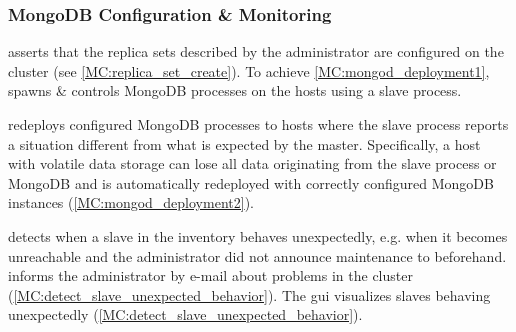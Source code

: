 \subsubsection{MongoDB Configuration \& Monitoring}
\begin{description}
	 \mamid asserts that the \glspl{replica set} described by the administrator are configured on the cluster 
	(see \ref{MC:replica_set_create}). \done
	 To achieve \ref{MC:mongod_deployment1}, \mamid spawns \& controls MongoDB processes on the hosts 
	using a slave process. \done
	\begin{description}
		 \mamid redeploys configured MongoDB processes to hosts where the slave process reports 
		a situation different from what is expected by the master. \done
		 Specifically, a host with volatile data storage can lose all data originating 
		from the slave process or MongoDB and is automatically redeployed with correctly configured MongoDB instances 
		(\ref{MC:mongod_deployment2}). \done
	\end{description}
	
	 \mamid detects when a slave in the inventory behaves unexpectedly, e.g. when 
	it becomes unreachable and the administrator did not announce maintenance to \mamid beforehand. \done
	 \mamid informs the administrator by e-mail about problems in the cluster 
	(\ref{MC:detect_slave_unexpected_behavior}). \done
	 The gui visualizes slaves behaving unexpectedly (\ref{MC:detect_slave_unexpected_behavior}). \done
\end{description}

